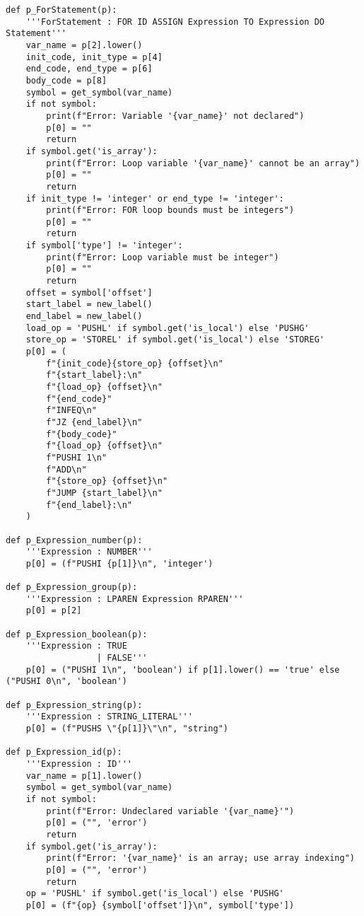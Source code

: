 \documentclass[12pt,a4paper]{report}%
\begin{document}
\begin{lstlisting}[style=pythonStyle, caption={Ficheiro lex.py}]
def p_ForStatement(p):
    '''ForStatement : FOR ID ASSIGN Expression TO Expression DO Statement'''
    var_name = p[2].lower()
    init_code, init_type = p[4]
    end_code, end_type = p[6]
    body_code = p[8]
    symbol = get_symbol(var_name)
    if not symbol:
        print(f"Error: Variable '{var_name}' not declared")
        p[0] = ""
        return
    if symbol.get('is_array'):
        print(f"Error: Loop variable '{var_name}' cannot be an array")
        p[0] = ""
        return
    if init_type != 'integer' or end_type != 'integer':
        print(f"Error: FOR loop bounds must be integers")
        p[0] = ""
        return
    if symbol['type'] != 'integer':
        print(f"Error: Loop variable must be integer")
        p[0] = ""
        return
    offset = symbol['offset']
    start_label = new_label()
    end_label = new_label()
    load_op = 'PUSHL' if symbol.get('is_local') else 'PUSHG'
    store_op = 'STOREL' if symbol.get('is_local') else 'STOREG'
    p[0] = (
        f"{init_code}{store_op} {offset}\n"
        f"{start_label}:\n"
        f"{load_op} {offset}\n"
        f"{end_code}"
        f"INFEQ\n"
        f"JZ {end_label}\n"
        f"{body_code}"
        f"{load_op} {offset}\n"
        f"PUSHI 1\n"
        f"ADD\n"
        f"{store_op} {offset}\n"
        f"JUMP {start_label}\n"
        f"{end_label}:\n"
    )

def p_Expression_number(p):
    '''Expression : NUMBER'''
    p[0] = (f"PUSHI {p[1]}\n", 'integer')

def p_Expression_group(p):
    '''Expression : LPAREN Expression RPAREN'''
    p[0] = p[2]

def p_Expression_boolean(p):
    '''Expression : TRUE
                  | FALSE'''
    p[0] = ("PUSHI 1\n", 'boolean') if p[1].lower() == 'true' else ("PUSHI 0\n", 'boolean')

def p_Expression_string(p):
    '''Expression : STRING_LITERAL'''
    p[0] = (f"PUSHS \"{p[1]}\"\n", "string")

def p_Expression_id(p):
    '''Expression : ID'''
    var_name = p[1].lower()
    symbol = get_symbol(var_name)
    if not symbol:
        print(f"Error: Undeclared variable '{var_name}'")
        p[0] = ("", 'error')
        return
    if symbol.get('is_array'):
        print(f"Error: '{var_name}' is an array; use array indexing")
        p[0] = ("", 'error')
        return
    op = 'PUSHL' if symbol.get('is_local') else 'PUSHG'
    p[0] = (f"{op} {symbol['offset']}\n", symbol['type'])


\end{lstlisting}
\end{document}
